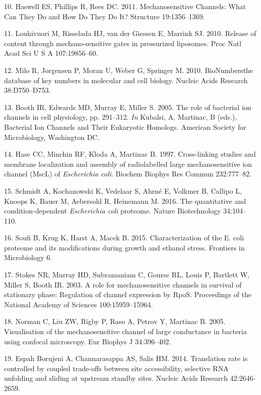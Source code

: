 \hypertarget{ref-haswell2011}{}
10.
Haswell
ES,
Phillips
R,
Rees
DC.
2011.
Mechanosensitive
Channels:
What
Can
They
Do and
How Do
They
Do It?
Structure
19:1356--1369.

\hypertarget{ref-louhivuori2010}{}
11.
Louhivuori
M,
Risselada
HJ,
van
der
Giessen
E,
Marrink
SJ.
2010.
Release
of
content
through
mechano-sensitive
gates
in
pressurized
liposomes.
Proc
Natl
Acad
Sci U
S A
107:19856--60.

\hypertarget{ref-milo2010}{}
12.
Milo
R,
Jorgensen
P,
Moran
U,
Weber
G,
Springer
M.
2010.
BioNumbersthe
database
of key
numbers
in
molecular
and
cell
biology.
Nucleic
Acids
Research
38:D750--D753.

\hypertarget{ref-booth2005}{}
13.
Booth
IR,
Edwards
MD,
Murray
E,
Miller
S.
2005.
The
role
of
bacterial
ion
channels
in
cell
physiology,
pp.
291--312.
\emph{In}
Kubalsi,
A,
Martinac,
B
(eds.),
Bacterial
Ion
Channels
and
Their
Eukaryotic
Homologs.
American
Society
for
Microbiology,
Washington
DC.

\hypertarget{ref-hase1997}{}
14.
Hase
CC,
Minchin
RF,
Kloda
A,
Martinac
B.
1997.
Cross-linking
studies
and
membrane
localization
and
assembly
of
radiolabelled
large
mechanosensitive
ion
channel
(MscL)
of
\emph{Escherichia
coli}.
Biochem
Biophys
Res
Commun
232:777--82.

\hypertarget{ref-schmidt2016}{}
15.
Schmidt
A,
Kochanowski
K,
Vedelaar
S,
Ahrné
E,
Volkmer
B,
Callipo
L,
Knoops
K,
Bauer
M,
Aebersold
R,
Heinemann
M.
2016.
The
quantitative
and
condition-dependent
\emph{Escherichia
coli}
proteome.
Nature
Biotechnology
34:104--110.

\hypertarget{ref-soufi2015}{}
16.
Soufi
B,
Krug
K,
Harst
A,
Macek
B.
2015.
Characterization
of the
E.
coli
proteome
and
its
modifications
during
growth
and
ethanol
stress.
Frontiers
in
Microbiology
6.

\hypertarget{ref-stokes2003a}{}
17.
Stokes
NR,
Murray
HD,
Subramaniam
C,
Gourse
RL,
Louis
P,
Bartlett
W,
Miller
S,
Booth
IR.
2003.
A role
for
mechanosensitive
channels
in
survival
of
stationary
phase:
Regulation
of
channel
expression
by
RpoS.
Proceedings
of the
National
Academy
of
Sciences
100:15959--15964.

\hypertarget{ref-norman2005}{}
18.
Norman
C, Liu
ZW,
Rigby
P,
Raso
A,
Petrov
Y,
Martinac
B.
2005.
Visualisation
of the
mechanosensitive
channel
of
large
conductance
in
bacteria
using
confocal
microscopy.
Eur
Biophys
J
34:396--402.

\hypertarget{ref-espahborujeni2014}{}
19.
Espah
Borujeni
A,
Channarasappa
AS,
Salis
HM.
2014.
Translation
rate
is
controlled
by
coupled
trade-offs
between
site
accessibility,
selective
RNA
unfolding
and
sliding
at
upstream
standby
sites.
Nucleic
Acids
Research
42:2646--2659.

